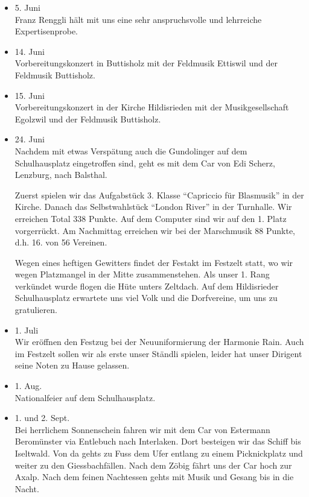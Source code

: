 \begin{multicols}{2}
\begin{itemize}
        \item[]5. Juni\\
        Franz Renggli hält mit uns eine sehr anspruchsvolle und lehrreiche
        Expertisenprobe.

        \item[]14. Juni\\
        Vorbereitungskonzert in Buttisholz mit der Feldmusik Ettiswil und der
        Feldmusik Buttisholz.

        \item[]15. Juni\\
        Vorbereitungskonzert in der Kirche Hildisrieden mit der
        Musikgesellschaft Egolzwil und der Feldmusik Buttisholz.

        \item[]24. Juni\\
        Nachdem mit etwas Verspätung auch die Gundolinger auf dem Schulhausplatz
        eingetroffen sind, geht es mit dem Car von Edi Scherz, Lenzburg, nach
        Balsthal.

        Zuerst spielen wir das Aufgabstück 3. Klasse \enquote{Capriccio für
            Blasmusik} in der Kirche. Danach das Selbstwahlstück \enquote{London
            River} in der Turnhalle. Wir erreichen Total 338 Punkte. Auf dem
        Computer sind wir auf den 1. Platz vorgerrückt. Am Nachmittag
        erreichen wir bei der Marschmusik 88 Punkte, d.h. 16. von 56
        Vereinen.

        Wegen eines heftigen Gewitters findet der Festakt im Festzelt statt, wo
        wir wegen Platzmangel in der Mitte zusammenstehen. Als unser 1. Rang
        verkündet wurde flogen die Hüte unters Zeltdach. Auf dem Hildisrieder
        Schulhausplatz erwartete uns viel Volk und die Dorfvereine, um uns zu
        gratulieren.

        \item[]1. Juli\\
        Wir eröffnen den Festzug bei der Neuuniformierung der Harmonie Rain.
        Auch im Festzelt sollen wir als erste unser Ständli spielen, leider hat
        unser Dirigent seine Noten zu Hause gelassen.

        \item[]1. Aug.\\
        Nationalfeier auf dem Schulhausplatz.

        \item[]1. und 2. Sept.\\
        Bei herrlichem Sonnenschein fahren wir mit dem Car von Estermann
        Beromünster via Entlebuch nach Interlaken. Dort besteigen wir das Schiff
        bis Iseltwald. Von da gehts zu Fuss dem Ufer entlang zu einem
        Picknickplatz und weiter zu den Giessbachfällen. Nach dem Zöbig fährt
        uns der Car hoch zur Axalp. Nach dem feinen Nachtessen gehts mit Musik
        und Gesang bis in die Nacht.


\end{itemize}
\end{multicols}
